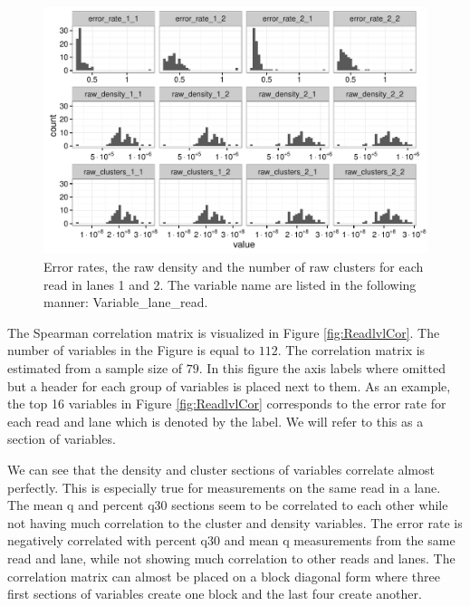 \documentclass[a4paper,11pt,fleqn,twoside,notitlepage]{report}
\makeatletter
\def\maxwidth{ %
  \ifdim\Gin@nat@width>\linewidth
    \linewidth
  \else
    \Gin@nat@width
  \fi
}
\newenvironment{kframe}{%
 \def\at@end@of@kframe{}%
 \ifinner\ifhmode%
  \def\at@end@of@kframe{\end{minipage}}%
  \begin{minipage}{\columnwidth}%
 \fi\fi%
 \def\FrameCommand##1{\hskip\@totalleftmargin \hskip-\fboxsep
 \colorbox{shadecolor}{##1}\hskip-\fboxsep
     \hskip-\linewidth \hskip-\@totalleftmargin \hskip\columnwidth}%
 \MakeFramed {\advance\hsize-\width
   \@totalleftmargin\z@ \linewidth\hsize
   \@setminipage}}%
 {\par\unskip\endMakeFramed%
 \at@end@of@kframe}
\newenvironment{knitrout}{}{} %
\makeatother
\begin{document}
\begin{knitrout}
\begin{kframe}
{\ttfamily\noindent\itshape\color{messagecolor}{\#\# `stat\_bin()` using `bins = 30`. Pick better value with `binwidth`.}}\end{kframe}\begin{figure}[!htb]
\includegraphics[width=\maxwidth]{figure/ReadlvlER-1} \caption[Error rates, the raw density and the number of raw clusters for each read in lanes 1 and 2]{Error rates, the raw density and the number of raw clusters for each read in lanes 1 and 2. The variable name are listed in the following manner: Variable\_lane\_read.}\label{fig:ReadlvlER}
\end{figure}


\end{knitrout}
The Spearman correlation matrix is visualized in Figure \ref{fig:ReadlvlCor}. The number of variables in the Figure is equal to $112$. The correlation matrix is estimated from a sample size of $79$. In this figure the axis labels where omitted but a header for each group of variables is placed next to them. As an example, the top 16 variables in Figure \ref{fig:ReadlvlCor} corresponds to the error rate for each read and lane which is denoted by the label. We will refer to this as a section of variables. 

We can see that the density and cluster sections of variables correlate almost perfectly. This is especially true for measurements on the same read in a lane. The mean q and percent q30 sections seem to be correlated to each other while not having much correlation to the cluster and density variables. The error rate is negatively correlated with percent q30 and mean q measurements from the same read and lane, while not showing much correlation to other reads and lanes. The correlation matrix can almost be placed on a block diagonal form where three first sections of variables create one block and the last four create another. %
\end{document}
